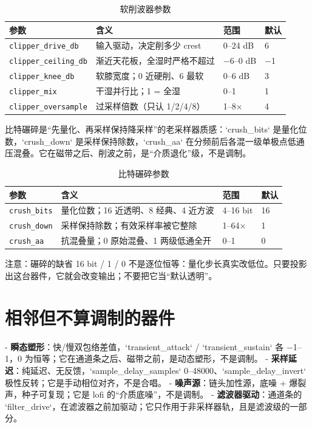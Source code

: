 \begin{table}[htbp]
\centering
\small
\begin{tabular}{@{}llll@{}}
\hline
参数 & 含义 & 范围 & 默认 \\
\hline
\texttt{clipper\_drive\_db} & 输入驱动，决定削多少 crest & 0–24 dB & 6 \\
\texttt{clipper\_ceiling\_db} & 渐近天花板，全湿时严格不超过 & −6–0 dB & −1 \\
\texttt{clipper\_knee\_db} & 软膝宽度；0 近硬削、6 最软 & 0–6 dB & 3 \\
\texttt{clipper\_mix} & 干湿并行比；1 = 全湿 & 0–1 & 1 \\
\texttt{clipper\_oversample} & 过采样倍数（只认 1/2/4/8） & 1–8× & 4 \\
\hline
\end{tabular}
\caption{软削波器参数}
\label{tab:clipper-params}
\end{table}

比特碾碎是“先量化、再采样保持降采样”的老采样器质感：`crush_bits` 是量化位数，`crush_down` 是采样保持除数，`crush_aa` 在分频前后各混一级单极点低通压混叠。它在磁带之后、削波之前，是“介质退化”级，不是调制。

\begin{table}[htbp]
\centering
\small
\begin{tabular}{@{}llll@{}}
\hline
参数 & 含义 & 范围 & 默认 \\
\hline
\texttt{crush\_bits} & 量化位数；16 近透明、8 经典、4 近方波 & 4–16 bit & 16 \\
\texttt{crush\_down} & 采样保持除数；有效采样率被它整除 & 1–64× & 1 \\
\texttt{crush\_aa} & 抗混叠量；0 原始混叠、1 两级低通全开 & 0–1 & 0 \\
\hline
\end{tabular}
\caption{比特碾碎参数}
\label{tab:crusher-params}
\end{table}

注意：碾碎的缺省 16 bit / 1 / 0 不是逐位恒等：量化步长真实改低位。只要投影出这台器件，它就会改变输出；不要把它当“默认透明”。

\section{相邻但不算调制的器件}

- \textbf{瞬态塑形}：快/慢双包络差值，`transient_attack` / `transient_sustain` 各 −1–1，0 为恒等；它在通道条之后、磁带之前，是动态塑形，不是调制。
- \textbf{采样延迟}：纯延迟、无反馈，`sample_delay_samples` 0–48000、`sample_delay_invert` 极性反转；它是手动相位对齐，不是合唱。
- \textbf{噪声源}：链头加性源，底噪 + 爆裂声，种子可复现；它是 lofi 的“介质底噪”，不是调制。
- \textbf{滤波器驱动}：通道条的 `filter_drive`，在滤波器之前加驱动；它只作用于非采样器轨，且是滤波级的一部分。

